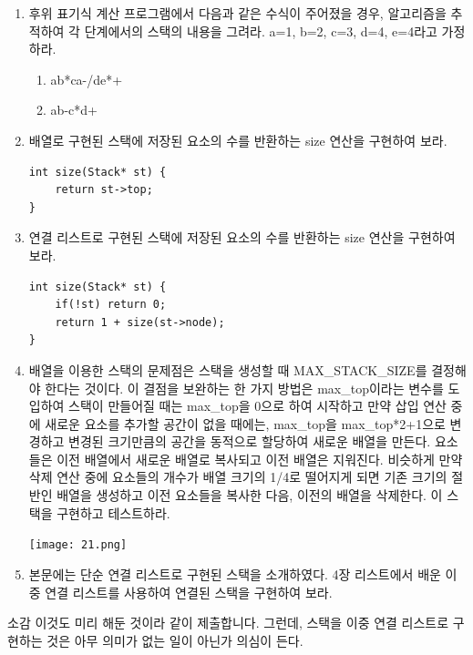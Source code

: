 \documentclass[11pt,a4paper]{article}
\begin{document}
\begin{enumerate}
\item 후위 표기식 계산 프로그램에서 다음과 같은 수식이 주어졌을 경우, 알고리즘을 추적하여 각 단계에서의 스택의 내용을 그려라. a=1, b=2, c=3, d=4, e=4라고 가정하라.
\begin{enumerate}
	\item ab*ca-/de*+
	\item ab-c*d+
\end{enumerate}

\item 배열로 구현된 스택에 저장된 요소의 수를 반환하는 size 연산을 구현하여 보라.
\begin{lstlisting}
int size(Stack* st) {
	return st->top;
}
\end{lstlisting}

\item 연결 리스트로 구현된 스택에 저장된 요소의 수를 반환하는 size 연산을 구현하여 보라.
\begin{lstlisting}
int size(Stack* st) {
	if(!st) return 0;
	return 1 + size(st->node);
}
\end{lstlisting}

\item 배열을 이용한 스택의 문제점은 스택을 생성할 때 MAX\_STACK\_SIZE를 결정해야 한다는 것이다.
이 결점을 보완하는 한 가지 방법은 max\_top이라는 변수를 도입하여 스택이 만들어질 때는 max\_top을 0으로 하여 시작하고 만약 삽입 연산 중에 새로운 요소를 추가할 공간이 없을 때에는, max\_top을 max\_top*2+1으로 변경하고 변경된 크기만큼의 공간을 동적으로 할당하여 새로운 배열을 만든다.
요소들은 이전 배열에서 새로운 배열로 복사되고 이전 배열은 지워진다.
비슷하게 만약 삭제 연산 중에 요소들의 개수가 배열 크기의 1/4로 떨어지게 되면 기존 크기의 절반인 배열을 생성하고 이전 요소들을 복사한 다음, 이전의 배열을 삭제한다.
이 스택을 구현하고 테스트하라.


\texttt{[image: 21.png]}

\item 본문에는 단순 연결 리스트로 구현된 스택을 소개하였다. 4장 리스트에서 배운 이중 연결 리스트를 사용하여 연결된 스택을 구현하여 보라.
\end{enumerate}

\vspace{2cm}
{\Huge 소감}
이것도 미리 해둔 것이라 같이 제출합니다. 그런데, 스택을 이중 연결 리스트로 구현하는 것은 아무 의미가 없는 일이 아닌가 의심이 든다.
\end{document}
